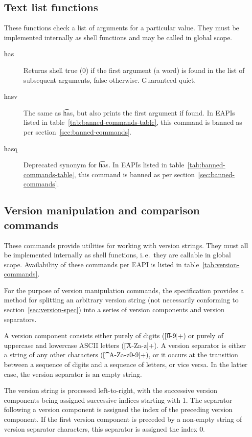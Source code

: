 \subsection{Text list functions}
These functions check a list of arguments for a particular value. They must be implemented
internally as shell functions and may be called in global scope.
\nobreakpar
\begin{description}
\item[has] Returns shell true (0) if the first argument (a word) is found in the list of subsequent
    arguments, false otherwise. Guaranteed quiet.
\item[hasv] The same as \t{has}, but also prints the first argument if found.
    In EAPIs listed in table~\ref{tab:banned-commands-table}, this command is banned as per
    section~\ref{sec:banned-commands}.
\item[hasq] Deprecated synonym for \t{has}.
    In EAPIs listed in table~\ref{tab:banned-commands-table}, this command is banned as per
    section~\ref{sec:banned-commands}.
\end{description}

\subsection{Version manipulation and comparison commands}
These commands provide utilities for working with version strings. They must all be implemented
internally as shell functions, i.\,e.\ they are callable in global scope. Availability of these
commands per EAPI is listed in table~\ref{tab:version-commands}.

For the purpose of version manipulation commands, the specification provides a method for splitting
an arbitrary version string (not necessarily conforming to section~\ref{sec:version-spec}) into
a series of version components and version separators.

A version component consists either purely of digits (\t{[0-9]+}) or purely of uppercase and
lowercase ASCII letters (\t{[A-Za-z]+}). A version separator is either a string of any other
characters (\t{[\textasciicircum A-Za-z0-9]+}), or it occurs at the transition between a sequence
of digits and a sequence of letters, or vice versa. In the latter case, the version separator is
an empty string.

The version string is processed left-to-right, with the successive version components being assigned
successive indices starting with 1. The separator following a version component is assigned
the index of the preceding version component. If the first version component is preceded by
a non-empty string of version separator characters, this separator is assigned the index 0.

